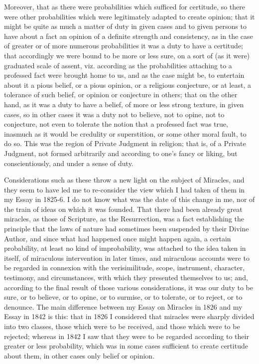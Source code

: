Moreover, that as there were probabilities which sufficed for certitude, so there
were other probabilities which were legitimately adapted to create
opinion; that it might be quite as much a matter of duty in given
cases and to given persons to have about a fact an opinion of a
definite strength and consistency, as in the case of greater or of
more numerous probabilities it was a duty to have a certitude; that
accordingly we were bound to be more or less sure, on a sort of
(as it were) graduated scale of assent, viz. according as the
probabilities attaching to a professed fact were brought home to us,
and as the case might be, to entertain about it a pious belief, or a
pious opinion, or a religious conjecture, or at least, a tolerance of
such belief, or opinion or conjecture in others; that on the other
hand, as it was a duty to have a belief, of more or less strong
texture, in given cases, so in other cases it was a duty not to
believe, not to opine, not to conjecture, not even to tolerate the
notion that a professed fact was true, inasmuch as it would be
credulity or superstition, or some other moral fault, to do so. This
was the region of Private Judgment in religion; that is, of a Private
Judgment, not formed arbitrarily and according to one's fancy or
liking, but conscientiously, and under a sense of duty.

Considerations such as these throw a new light on the subject of
Miracles, and they seem to have led me to re-consider the view which I
had taken of them in my
Essay in 1825-6. I do not know what was the date of this change in me,
nor of the train of ideas on which it was founded. That there had been
already great miracles, as those of Scripture, as the Resurrection,
was a fact establishing the principle that the laws of nature had
sometimes been suspended by their Divine Author, and since what had
happened once might happen again, a certain probability, at least no
kind of improbability, was attached to the idea taken in itself, of
miraculous intervention in later times, and miraculous accounts were
to be regarded in connexion with the verisimilitude, scope,
instrument, character, testimony, and circumstances, with which they
presented themselves to us; and, according to the final result of
those various considerations, it was our duty to be sure, or to
believe, or to opine, or to surmise, or to tolerate, or to reject, or
to denounce. The main difference between my Essay on Miracles in 1826
and my Essay in 1842 is this: that in 1826 I considered that miracles
were sharply divided into two classes, those which were to be
received, and those which were to be rejected; whereas in 1842 I saw
that they were to be regarded according to their greater or less
probability, which was in some cases sufficient to create certitude
about them, in other cases only belief or opinion.

